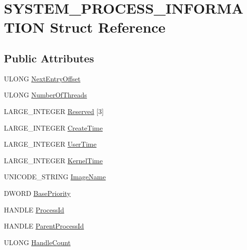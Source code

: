 \hypertarget{structSYSTEM__PROCESS__INFORMATION}{\section{S\-Y\-S\-T\-E\-M\-\_\-\-P\-R\-O\-C\-E\-S\-S\-\_\-\-I\-N\-F\-O\-R\-M\-A\-T\-I\-O\-N Struct Reference}
\label{structSYSTEM__PROCESS__INFORMATION}
}
\subsection*{Public Attributes}
\begin{DoxyCompactItemize}
\item 
U\-L\-O\-N\-G \hyperlink{structSYSTEM__PROCESS__INFORMATION_aa92576ae6698bea511915a7b14eafd7a}{Next\-Entry\-Offset}
\item 
U\-L\-O\-N\-G \hyperlink{structSYSTEM__PROCESS__INFORMATION_a1c86fe94f67735d0688a533d32df3506}{Number\-Of\-Threads}
\item 
L\-A\-R\-G\-E\-\_\-\-I\-N\-T\-E\-G\-E\-R \hyperlink{structSYSTEM__PROCESS__INFORMATION_a6e3f80970bfe1695bb51571a9e525a2e}{Reserved} \mbox{[}3\mbox{]}
\item 
L\-A\-R\-G\-E\-\_\-\-I\-N\-T\-E\-G\-E\-R \hyperlink{structSYSTEM__PROCESS__INFORMATION_ac652f3a31ff840be6134d43f6fdc19e2}{Create\-Time}
\item 
L\-A\-R\-G\-E\-\_\-\-I\-N\-T\-E\-G\-E\-R \hyperlink{structSYSTEM__PROCESS__INFORMATION_a712c9a7874855d5480cdc3254e637d64}{User\-Time}
\item 
L\-A\-R\-G\-E\-\_\-\-I\-N\-T\-E\-G\-E\-R \hyperlink{structSYSTEM__PROCESS__INFORMATION_ae3abb04a658583b590e640c4066c71c5}{Kernel\-Time}
\item 
U\-N\-I\-C\-O\-D\-E\-\_\-\-S\-T\-R\-I\-N\-G \hyperlink{structSYSTEM__PROCESS__INFORMATION_a80d322bf9c6cf036add24770fe2a1007}{Image\-Name}
\item 
D\-W\-O\-R\-D \hyperlink{structSYSTEM__PROCESS__INFORMATION_a1e17428ae6e3cf412506c78188ebdd64}{Base\-Priority}
\item 
H\-A\-N\-D\-L\-E \hyperlink{structSYSTEM__PROCESS__INFORMATION_a1c6313542629246fec2ba77d74f565df}{Process\-Id}
\item 
H\-A\-N\-D\-L\-E \hyperlink{structSYSTEM__PROCESS__INFORMATION_a1f589edd22835d68fabb981742e4352d}{Parent\-Process\-Id}
\item 
U\-L\-O\-N\-G \hyperlink{structSYSTEM__PROCESS__INFORMATION_a93f9b00fb212269bef62e565500b2383}{Handle\-Count}

\end{DoxyCompactItemize}
